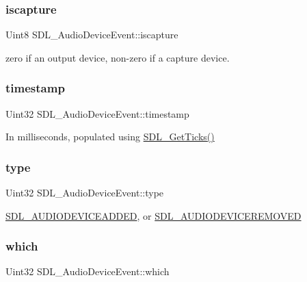 \subsubsection{\texorpdfstring{iscapture}{iscapture}}
{\footnotesize\ttfamily Uint8 S\+D\+L\+\_\+\+Audio\+Device\+Event\+::iscapture}

zero if an output device, non-\/zero if a capture device. \mbox{\label{structSDL__AudioDeviceEvent_aa471680486a6103eafc9af569016df57}} 
\subsubsection{\texorpdfstring{timestamp}{timestamp}}
{\footnotesize\ttfamily Uint32 S\+D\+L\+\_\+\+Audio\+Device\+Event\+::timestamp}

In milliseconds, populated using \hyperlink{SDL__timer_8h_a0b9bc71d6287e0ffafdc3419760fe2b3}{S\+D\+L\+\_\+\+Get\+Ticks()} \mbox{\label{structSDL__AudioDeviceEvent_ae68c3bd49b49608711a17395c7cbfe58}} 
\subsubsection{\texorpdfstring{type}{type}}
{\footnotesize\ttfamily Uint32 S\+D\+L\+\_\+\+Audio\+Device\+Event\+::type}

\hyperlink{SDL__events_8h_a3b589e89be6b35c02e0dd34a55f3fccaadb3154654baf003910e75d74b507a82b}{S\+D\+L\+\_\+\+A\+U\+D\+I\+O\+D\+E\+V\+I\+C\+E\+A\+D\+D\+ED}, or \hyperlink{SDL__events_8h_a3b589e89be6b35c02e0dd34a55f3fccaad56f8934fe24ee4c0cd9329e3c57c0c2}{S\+D\+L\+\_\+\+A\+U\+D\+I\+O\+D\+E\+V\+I\+C\+E\+R\+E\+M\+O\+V\+ED} \mbox{\label{structSDL__AudioDeviceEvent_ac91d70fd4e1dd596185fed061388896c}} 
\subsubsection{\texorpdfstring{which}{which}}
{\footnotesize\ttfamily Uint32 S\+D\+L\+\_\+\+Audio\+Device\+Event\+::which}

